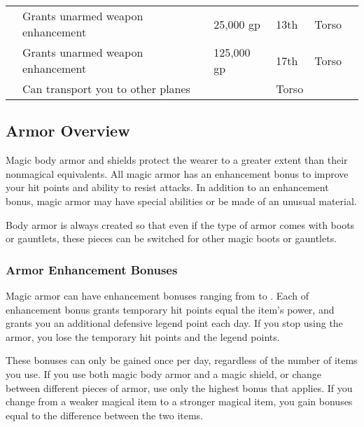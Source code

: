 \begin{longtabuwrapper}
\begin{longtabu}{l X l l l l}
                  & Grants  unarmed weapon enhancement & 25,000 gp & 13th & Torso &  \\
                  & Grants  unarmed weapon enhancement & 125,000 gp & 17th & Torso &  \\
                 & Can transport you to other planes &  & Torso &  \\
            \end{longtabu}
        \end{longtabuwrapper}
        \twocolumn

    \subsection{Armor Overview}

        Magic body armor and shields protect the wearer to a greater extent than their nonmagical equivalents.
        All magic armor has an enhancement bonus to improve your hit points and ability to resist attacks.
        In addition to an enhancement bonus, magic armor may have special abilities or be made of an unusual material.

        Body armor is always created so that even if the type of armor comes with boots or gauntlets, these pieces can be switched for other magic boots or gauntlets.

        \subsubsection{Armor Enhancement Bonuses}\label{Armor Enhancement Bonuses}

            Magic armor can have enhancement bonuses ranging from  to .
            Each  of enhancement bonus grants temporary hit points equal the item's power, and grants you an additional defensive legend point each day.
            If you stop using the armor, you lose the temporary hit points and the legend points.

            These bonuses can only be gained once per day, regardless of the number of items you use.
            If you use both magic body armor and a magic shield, or change between different pieces of armor, use only the highest bonus that applies.
            If you change from a weaker magical item to a stronger magical item, you gain bonuses equal to the difference between the two items.

